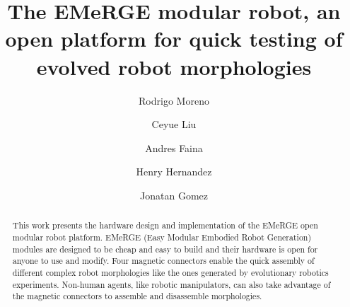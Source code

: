 \documentclass[sigconf]{acmart}
\begin{document}
\title[The EMeRGE modular robot]{The EMeRGE modular robot, an open platform for quick testing of evolved robot morphologies}

\author[R. Moreno]{Rodrigo Moreno}

\author[C. Liu]{Ceyue Liu}

\author[A. Faina]{Andres Faina}

\author[H. Hernandez]{Henry Hernandez}

\author[J. Gomez]{Jonatan Gomez}

\begin{abstract}
This work presents the hardware design and implementation of the EMeRGE open modular robot platform. EMeRGE (Easy Modular Embodied Robot Generation) modules are designed to be cheap and easy to build and their hardware is open for anyone to use and modify. Four magnetic connectors enable the quick assembly of different complex robot morphologies like the ones generated by evolutionary robotics experiments. Non-human agents, like robotic manipulators, can also take advantage of the magnetic connectors to assemble and disassemble morphologies. 
\end{abstract}
\end{document}
